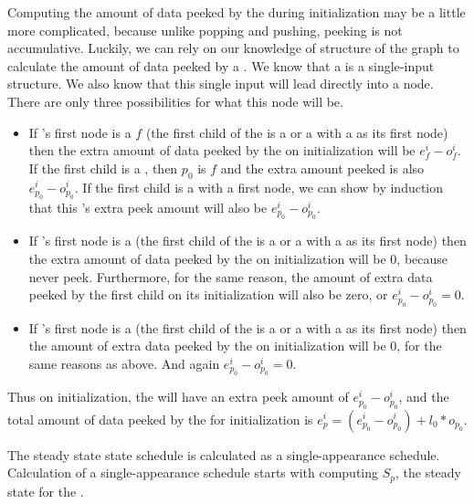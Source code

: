 Computing the amount of data peeked by the {\pipeline} during
initialization may be a little more complicated, because unlike
popping and pushing, peeking is not accumulative. Luckily, we can
rely on our knowledge of structure of the {\StreamIt} graph to
calculate the amount of data peeked by a {\pipeline}. We know that a
{\pipeline} is a single-input structure. We also know that this
single input will lead directly into a {\StreamIt} node.  There are
only three possibilities for what this node will be.

\begin{itemize}
\item If {\pipeline}'s first node is a {\filter} $f$ (the first child
of the {\pipeline} is a {\filter} or a {\pipeline} with a {\filter} as its
first node) then the extra amount of data peeked by the {\pipeline}
on initialization will be $e^i_f - o^i_f$. If the first child is a
{\filter}, then $p_0$ is $f$ and the extra amount peeked is also
$e^i_{p_0} - o^i_{p_0}$.  If the first child is a {\pipeline} with a
{\filter} first node, we can show by induction that this {\pipeline}'s
extra peek amount will also be $e^i_{p_0} - o^i_{p_0}$.

\item If {\pipeline}'s first node is a {\splitter} (the first child of
the {\pipeline} is a {\splitjoin} or a {\pipeline} with a {\splitter} as
its first node) then the extra amount of data peeked by the
{\pipeline} on initialization will be 0, because {\splitters} never
peek. Furthermore, for the same reason, the amount of extra data
peeked by the first child on its initialization will also be zero,
or $e^i_{p_0} - o^i_{p_0}= 0$.

\item If {\pipeline}'s first node is a {\joiner} (the first child of
the {\pipeline} is a {\feedbackloop} or a {\pipeline} with a {\joiner} as
its first node) then the amount of extra data peeked by the
{\pipeline} on initialization will be 0, for the same reasons as
above. And again $e^i_{p_0} - o^i_{p_0}= 0$.
\end{itemize}

Thus on initialization, the {\pipeline} will have an extra peek
amount of $e^i_{p_0} - o^i_{p_0}$, and the total amount of data
peeked by the {\pipeline} for initialization is $e^i_p = (e^i_{p_0}
- o^i_{p_0}) + l_0
* o_{p_0}$.


The steady state state schedule is calculated as a
single-appearance schedule.  Calculation of a single-appearance
schedule starts with computing $S_p$, the steady state for the
{\pipeline}.

